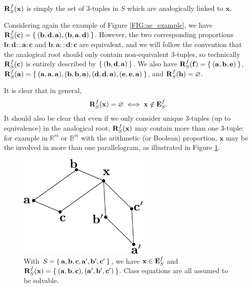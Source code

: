 \noindent
$\mathbf{R}_{S}^{f}(\mathbf{x})$ is simply the set of 3-tuples in $S$ which are analogically linked to
$\mathbf{x}$.

\begin{testexample}
Considering again the example of Figure \ref{FIG:ae_example}, we have 
$\mathbf{R}_{S}^{f}(\mathbf{c}) = \Set{(\mathbf{b}, \mathbf{d},\mathbf{a}),
(\mathbf{b}, \mathbf{a},\mathbf{d})}$. However, the two corresponding
proportions $\mathbf{b}: \mathbf{d}::\mathbf{a}:\mathbf{c}$ and $\mathbf{b}:
\mathbf{a}::\mathbf{d}:\mathbf{c}$ are equivalent, and we will follow the
convention that the analogical root should only contain non-equivalent
3-tuples, so technically $\mathbf{R}_{S}^{f}(\mathbf{c})$ is entirely described by
$\Set{(\mathbf{b}, \mathbf{d},\mathbf{a})}$.  We also have 
$\mathbf{R}_{S}^{f}(\mathbf{f}) = \Set{(\mathbf{a}, \mathbf{b},
\mathbf{e})}$, $\mathbf{R}_{S}^{f}(\mathbf{a}) = \Set{(\mathbf{a}, \mathbf{a},
\mathbf{a}), (\mathbf{b}, \mathbf{b}, \mathbf{a}), (\mathbf{d}, \mathbf{d},
\mathbf{a}), (\mathbf{e}, \mathbf{e}, \mathbf{a})}$, and
$\mathbf{R}_{S}^{f}(\mathbf{h}) = \varnothing$. \end{testexample}

It is clear that in general, $$\mathbf{R}_{S}^{f}(\mathbf{x}) = \varnothing\iff \mathbf{x} \notin
\mathbf{E}_{S}^{f}.$$ It should also be clear that even if we only consider unique 3-tuples
(up to equivalence) in the analogical root, $\mathbf{R}_{S}^{f}(\mathbf{x})$ may contain more than one
3-tuple: for example in $\mathbb{R}^m$ or $\mathbb{B}^m$ with the arithmetic
(or Boolean) proportion, $\mathbf{x}$ may be the involved in more than one
parallelogram, as illustrated in Figure \ref{FIG:multiple_parallelograms}.

\begin{figure}[!h]
\centering
  \includegraphics[width=2.5in]{figures/multiple_parallelograms.pdf}
  \caption{With $S = \Set{\mathbf{a}, \mathbf{b}, \mathbf{c}, \mathbf{a}',
  \mathbf{b}', \mathbf{c}'}$, we have $\mathbf{x} \in \mathbf{E}_{S}^{f}$ and $\mathbf{R}_{S}^{f}(\mathbf{x}) =
  \Set{(\mathbf{a}, \mathbf{b}, \mathbf{c}), (\mathbf{a}', \mathbf{b}',
  \mathbf{c}')}$. Class equations are all assumed to be solvable.}
\label{FIG:multiple_parallelograms}
\end{figure}

